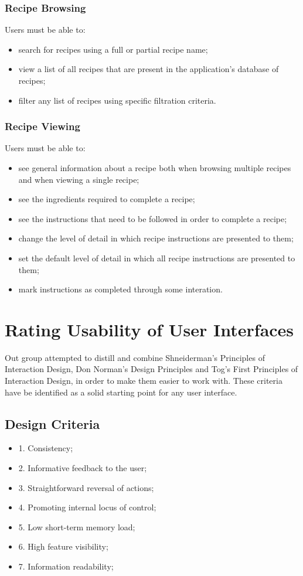 \subsubsection{Recipe Browsing}
Users must be able to:
\begin{itemize}
\item search for recipes using a full or partial recipe name;
\item view a list of all recipes that are present in the application's database of recipes;
\item filter any list of recipes using specific filtration criteria.
\end{itemize}

\subsubsection{Recipe Viewing}
Users must be able to:
\begin{itemize}
\item see general information about a recipe both when browsing multiple recipes and when viewing a single recipe;
\item see the ingredients required to complete a recipe;
\item see the instructions that need to be followed in order to complete a recipe;
\item change the level of detail in which recipe instructions are presented to them;
\item set the default level of detail in which all recipe instructions are presented to them;
\item mark instructions as completed through some interation.
\end{itemize}

\section*{Rating Usability of User Interfaces}
Out group attempted to distill and combine Shneiderman's Principles of Interaction Design, Don Norman's Design Principles and Tog's First Principles of Interaction Design, in order to make them easier to work with. These criteria have be identified as a solid starting point for any user interface.

\subsection*{Design Criteria}
\begin{itemize}
\item 1. Consistency;
\item 2. Informative feedback to the user;
\item 3. Straightforward reversal of actions;
\item 4. Promoting internal locus of control;
\item 5. Low short-term memory load;
\item 6. High feature visibility;
\item 7. Information readability;
\end{itemize}

